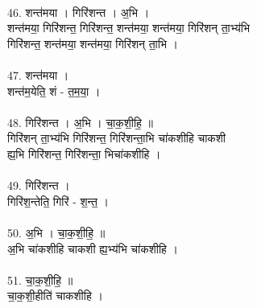 \\
46. शन्त॑मया । गिरि॑शन्त । अ॒भि ।\\
शन्त॑मया॒ गिरि॑शन्त॒ गिरि॑शन्त॒ शन्त॑मया॒ शन्त॑मया॒ गिरि॑शन् ता॒भ्य॑भि\\
गिरि॑शन्त॒ शन्त॑मया॒ शन्त॑मया॒ गिरि॑शन् ता॒भि ।\\
\\
47. शन्त॑मया ।\\
शन्त॑म॒येति॒ शं - त॒म॒या॒ ।\\
\\
48. गिरि॑शन्त । अ॒भि । चा॒क॒शी॒हि॒ ॥\\
गिरि॑शन् ता॒भ्य॑भि गिरि॑शन्त॒ गिरि॑शन्ता॒भि चा॑कशीहि चाकशी\\
ह्य॒भि गिरि॑शन्त॒ गिरि॑शन्ता॒ भिचा॑कशीहि ।\\
\\
49. गिरि॑शन्त ।\\
गिरि॑श॒न्तेति॒ गिरि॑ - श॒न्त॒ ।\\
\\
50. अ॒भि । चा॒क॒शी॒हि॒ ॥\\
अ॒भि चा॑कशीहि चाकशी ह्य॒भ्य॑भि चा॑कशीहि ।\\
\\
51. चा॒क॒शी॒हि॒ ॥\\
चा॒क॒शी॒हीति॑ चाकशीहि ।\\
\\
